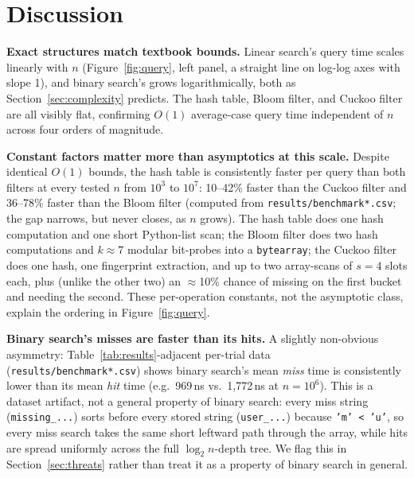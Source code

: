 \documentclass[acmsmall,screen,nonacm=true]{acmart}
\begin{document}
\section{Discussion}
\label{sec:discussion}

\textbf{Exact structures match textbook bounds.} Linear search's query time
scales linearly with $n$ (Figure~\ref{fig:query}, left panel, a straight
line on log-log axes with slope 1), and binary search's grows
logarithmically, both as Section~\ref{sec:complexity} predicts. The hash
table, Bloom filter, and Cuckoo filter are all visibly flat, confirming
$O(1)$ average-case query time independent of $n$ across four orders of
magnitude.

\textbf{Constant factors matter more than asymptotics at this scale.}
Despite identical $O(1)$ bounds, the hash table is consistently faster per
query than both filters at every tested $n$ from $10^3$ to $10^7$: 10--42\%
faster than the Cuckoo filter and 36--78\% faster than the Bloom filter
(computed from \texttt{results/benchmark*.csv}; the gap narrows, but never
closes, as $n$ grows). The
hash table does one hash computation and one short Python-list scan; the
Bloom filter does two hash computations and $k\approx7$ modular
bit-probes into a \texttt{bytearray}; the Cuckoo filter does one hash, one
fingerprint extraction, and up to two array-scans of $s=4$ slots each,
plus (unlike the other two) an $\approx$10\% chance of missing on the
first bucket and needing the second. These per-operation constants, not
the asymptotic class, explain the ordering in Figure~\ref{fig:query}.

\textbf{Binary search's misses are faster than its hits.} A slightly
non-obvious asymmetry: Table~\ref{tab:results}-adjacent per-trial data
(\texttt{results/benchmark*.csv}) shows binary search's mean \emph{miss}
time is consistently lower than its mean \emph{hit} time (e.g.\ 969\,ns vs.\
1{,}772\,ns at $n=10^6$). This is a dataset artifact, not a general property
of binary search: every miss string (\texttt{missing\_...}) sorts before
every stored string (\texttt{user\_...}) because \texttt{'m' < 'u'}, so
every miss search takes the same short leftward path through the array,
while hits are spread uniformly across the full $\log_2 n$-depth tree. We
flag this in Section~\ref{sec:threats} rather than treat it as a property
of binary search in general.
\end{document}
